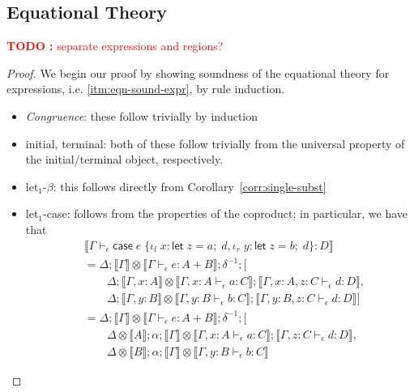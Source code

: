\documentclass[acmsmall,screen,review]{acmart}
\newcounter{todos}
\newcommand{\TODO}[1]{{
  \stepcounter{todos}
  \begin{center}\large{\textcolor{red}{\textbf{TODO \arabic{todos}:} #1}}\end{center}
}}
\newcommand{\ms}[1]{\ensuremath{\mathsf{#1}}}
\newcommand{\lto}{:}
\newcommand{\linl}[1]{\iota_l\;{#1}}
\newcommand{\linr}[1]{\iota_r\;{#1}}
\newcommand{\letexpr}[3]{\ensuremath{\ms{let}\;#1 = #2;\;#3}}
\newcommand{\caseexpr}[5]{\ms{case}\;#1\;\{\linl{#2} \lto #3, \linr{#4} \lto #5\}}
\newcommand{\bhyp}[2]{#1 : #2}
\newcommand{\hasty}[4]{#1 \vdash_{#2} #3: {#4}}
\newcommand{\brle}[1]{{\textsf{#1}}}
\newcommand{\dnt}[1]{\llbracket{#1}\rrbracket}
\begin{document}
\subsection{Equational Theory}

\TODO{separate expressions and regions?}

\soundnesseqn*

\label{proof:soundness-eqn}

\begin{proof}
  We begin our proof by showing soundness of the equational theory for expressions, i.e.
  \ref{itm:eqn-sound-expr}, by rule induction.
  \begin{itemize}[leftmargin=*]
    \item \emph{Congruence}: these follow trivially by induction
    \item \brle{initial}, \brle{terminal}: both of these follow trivially from the universal
    property of the initial/terminal object, respectively.
    \item \brle{let$_1$-$\beta$}: this follows directly from Corollary~\ref{corr:single-subst}
    \item \brle{let$_1$-case}: follows from the properties of the coproduct; in particular, we have
    that
    \begin{align*}
      & \dnt{\hasty{\Gamma}{\epsilon}{\caseexpr{e}{x}{\letexpr{z}{a}{d}}{y}{\letexpr{z}{b}{d}}}{D}}
      \\ &= \Delta ; \dnt{\Gamma} \otimes \dnt{\hasty{\Gamma}{\epsilon}{e}{A + B}} ; \delta^{-1} ; [
      \\ & \qquad \Delta
            ; \dnt{\Gamma, \bhyp{x}{A}} \otimes \dnt{\hasty{\Gamma, \bhyp{x}{A}}{\epsilon}{a}{C}}
            ; \dnt{\hasty{\Gamma, \bhyp{x}{A}, \bhyp{z}{C}}{\epsilon}{d}{D}}
            ,
      \\  & \qquad \Delta
            ; \dnt{\Gamma, \bhyp{y}{B}} \otimes \dnt{\hasty{\Gamma, \bhyp{y}{B}}{\epsilon}{b}{C}}
            ; \dnt{\hasty{\Gamma, \bhyp{y}{B}, \bhyp{z}{C}}{\epsilon}{d}{D}}
        ]
      \\ &= \Delta ; \dnt{\Gamma} \otimes \dnt{\hasty{\Gamma}{\epsilon}{e}{A + B}} ; \delta^{-1} ; [
      \\ & \qquad \Delta \otimes \dnt{A} ; \alpha
            ; \dnt{\Gamma} \otimes \dnt{\hasty{\Gamma, \bhyp{x}{A}}{\epsilon}{a}{C}}
            ; \dnt{\hasty{\Gamma, \bhyp{z}{C}}{\epsilon}{d}{D}}
            ,
      \\  & \qquad \Delta \otimes \dnt{B} ; \alpha
            ; \dnt{\Gamma} \otimes \dnt{\hasty{\Gamma, \bhyp{y}{B}}{\epsilon}{b}{C}}

\end{align*}
\end{itemize}
\end{proof}
\end{document}
